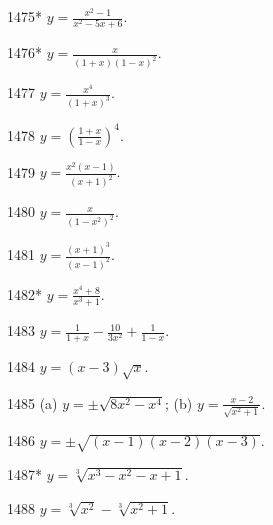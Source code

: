 \begin{prob}[S]{1475*}
$y = \frac{x^2 - 1}{x^2 - 5x + 6}.$
\end{prob}

\begin{prob}[S]{1476*}
$y = \frac{x}{(1+x)(1-x)^2}.$
\end{prob}

\begin{prob}[S]{1477}
$y = \frac{x^4}{(1+x)^3}.$
\end{prob}

\begin{prob}[S]{1478}
$y = \left(\frac{1+x}{1-x}\right)^4.$
\end{prob}

\begin{prob}[S]{1479}
$y = \frac{x^2(x-1)}{(x+1)^2}.$
\end{prob}

\begin{prob}[S]{1480}
$y = \frac{x}{(1-x^2)^2}.$
\end{prob}

\begin{prob}[S]{1481}
$y = \frac{(x+1)^3}{(x-1)^2}.$
\end{prob}

\begin{prob}[S]{1482*}
$y = \frac{x^4 + 8}{x^3 + 1}.$
\end{prob}

\begin{prob}[S]{1483}
$y = \frac{1}{1+x} - \frac{10}{3x^2} + \frac{1}{1-x}.$
\end{prob}

\begin{prob}[S]{1484}
$y = (x-3)\sqrt{x}.$
\end{prob}

\begin{prob}[M]{1485}
(a) $y = \pm\sqrt{8x^2 - x^4}$; \qquad (b) $y = \frac{x-2}{\sqrt{x^2+1}}.$
\end{prob}

\begin{prob}[S]{1486}
$y = \pm\sqrt{(x-1)(x-2)(x-3)}.$
\end{prob}

\begin{prob}[S]{1487*}
$y = \sqrt[3]{x^3 - x^2 - x + 1}.$
\end{prob}

\begin{prob}[S]{1488}
$y = \sqrt[3]{x^2} - \sqrt[3]{x^2 + 1}.$
\end{prob}

